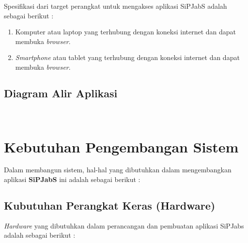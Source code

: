 Spesifikasi dari target perangkat untuk mengakses aplikasi SiPJabS adalah sebagai berikut : 

\begin{enumerate}

\item Komputer atau laptop yang terhubung dengan koneksi internet dan dapat membuka \textit{browser}.

\item	\textit{Smartphone} atau tablet yang terhubung dengan koneksi internet dan dapat membuka \textit{browser}.
\end{enumerate}

\subsection{Diagram Alir Aplikasi}
\blindtext \\

\section{Kebutuhan Pengembangan Sistem}

Dalam membangun sistem, hal-hal yang dibutuhkan dalam mengembangkan aplikasi \textbf{SiPJabS} ini adalah sebagai berikut :

\subsection{Kubutuhan Perangkat Keras (Hardware) }

\textit{Hardware} yang dibutuhkan dalam perancangan dan pembuatan aplikasi SiPJabs
adalah sebagai berikut :


